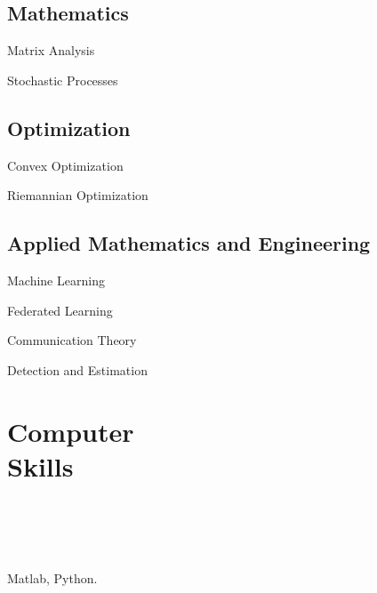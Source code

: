 \documentclass{article}
\begin{document}
\subsection*{Mathematics}
\begin{minipage}{0.28\linewidth}
 Matrix Analysis
\end{minipage} 
\begin{minipage}{0.4\linewidth}
Stochastic Processes
\end{minipage} 
\begin{minipage}{0.32\linewidth}
 
\end{minipage} 

\subsection*{Optimization} 
\begin{minipage}{0.28\linewidth}
Convex Optimization
\end{minipage}
\begin{minipage}{0.4\linewidth}
Riemannian Optimization
\end{minipage}
\begin{minipage}{0.32\linewidth}

\end{minipage}

\subsection*{Applied Mathematics and Engineering}
\begin{minipage}{0.28\linewidth}
Machine Learning
\end{minipage}
\begin{minipage}{0.20\linewidth}
Federated Learning
\end{minipage}
\begin{minipage}{0.25\linewidth}
Communication Theory
\end{minipage}
\begin{minipage}{0.25\linewidth}
Detection and Estimation
\end{minipage}



\section*{\colorbox{mygrey}{Computer Skills~~~~~~~~~~~~~~~~~~~~~~~~~~~~~~~~~~~~~~~~~~~~~~~~~~~~~~~~~~~~~~~~~~~~~~~~~~~~~~~~~~}}

Matlab,  Python.


\end{document}

